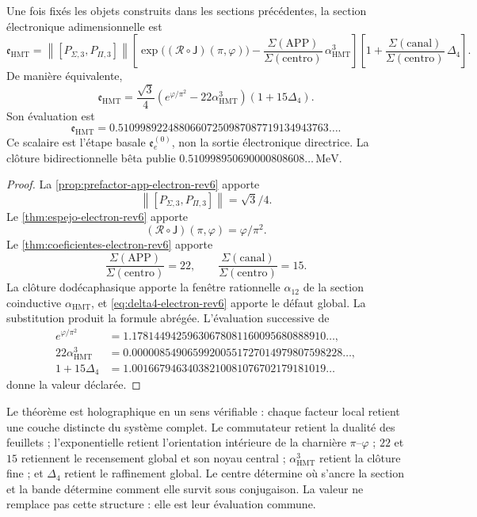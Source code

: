 \begin{theorem}
\label{thm:cierre-electron-holografico-rev6}
Une fois fixés les objets construits dans les sections précédentes, la section
électronique adimensionnelle est
\[
 \mathfrak e_{\mathrm{HMT}}
 =
 \left\|[P_{\Sigma,3},P_{\Pi,3}]\right\|
 \left[
 \exp\bigl((\mathscr R\circ\mathsf J)(\pi,\varphi)\bigr)
 -\frac{\Sigma(\mathrm{APP})}
 {\Sigma(\mathrm{centro})}\,
 \alpha_{\mathrm{HMT}}^3
 \right]
 \left[
 1+
 \frac{\Sigma(\mathrm{canal})}
 {\Sigma(\mathrm{centro})}\,
 \Delta_4
 \right].
\]
De manière équivalente,
\[
 \boxed{
 \mathfrak e_{\mathrm{HMT}}
 =
 \frac{\sqrt3}{4}
 \left(e^{\varphi/\pi^2}
 -22\alpha_{\mathrm{HMT}}^3\right)
 (1+15\Delta_4).}
\]
Son évaluation est
\[
 \boxed{
 \mathfrak e_{\mathrm{HMT}}
 =
 0.51099892248806607250987087719134943763\ldots.}
\]
Ce scalaire est l'étape basale \(\mathfrak e_e^{(0)}\), non la sortie
électronique directrice. La clôture bidirectionnelle bêta publie
\(0.510998950690000808608\ldots\,\mathrm{MeV}\).
\end{theorem}

\begin{proof}
La \cref{prop:prefactor-app-electron-rev6} apporte
\[
 \left\|[P_{\Sigma,3},P_{\Pi,3}]\right\|=\sqrt3/4.
\]
Le \cref{thm:espejo-electron-rev6} apporte
\[
 (\mathscr R\circ\mathsf J)(\pi,\varphi)=\varphi/\pi^2.
\]
Le \cref{thm:coeficientes-electron-rev6} apporte
\[
 \frac{\Sigma(\mathrm{APP})}{\Sigma(\mathrm{centro})}=22,
 \qquad
 \frac{\Sigma(\mathrm{canal})}{\Sigma(\mathrm{centro})}=15.
\]
La clôture dodécaphasique apporte la fenêtre rationnelle \(\alpha_{12}\) de la
section coinductive \(\alpha_{\mathrm{HMT}}\), et
\cref{eq:delta4-electron-rev6} apporte le défaut global. La substitution
produit la formule abrégée. L'évaluation successive de
\[
\begin{aligned}
 e^{\varphi/\pi^2}
 &=1.17814494259630678081160095680888910\ldots,\\
 22\alpha_{\mathrm{HMT}}^3
 &=0.00000854906599200551727014979807598228\ldots,\\
 1+15\Delta_4
 &=1.00166794634038210081076702179181019\ldots
\end{aligned}
\]
donne la valeur déclarée.
\end{proof}

Le théorème est holographique en un sens vérifiable : chaque facteur local
retient une couche distincte du système complet. Le commutateur retient la
dualité des feuillets ; l'exponentielle retient l'orientation intérieure de la
charnière \(\pi\)--\(\varphi\) ; \(22\) et \(15\) retiennent le recensement global et
son noyau central ; \(\alpha_{\mathrm{HMT}}^3\) retient la clôture fine ; et
\(\Delta_4\) retient le raffinement global. Le centre détermine où
s'ancre la section et la bande détermine comment elle survit sous conjugaison.
La valeur ne remplace pas cette structure : elle est leur évaluation commune.

